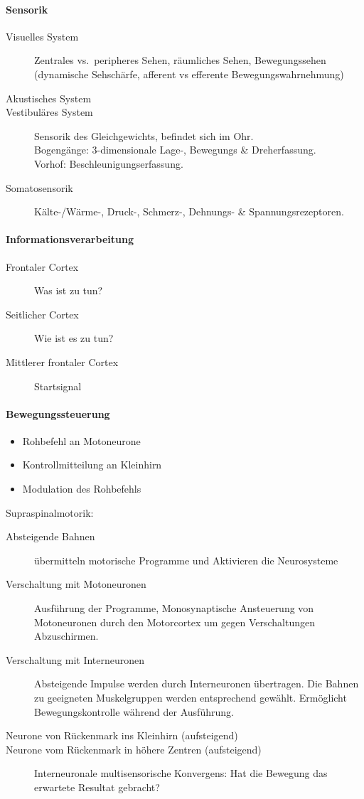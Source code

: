 \paragraph{Sensorik}
\begin{description}
  \item[Visuelles System] Zentrales vs.\ peripheres Sehen, räumliches Sehen, Bewegungssehen (dynamische Sehschärfe, afferent vs efferente Bewegungswahrnehmung)
  \item[Akustisches System]
  \item[Vestibuläres System] Sensorik des Gleichgewichts, befindet sich im Ohr.\\
    Bogengänge: 3-dimensionale Lage-, Bewegungs \& Dreherfassung.\\
    Vorhof: Beschleunigungserfassung.\\
  \item[Somatosensorik] Kälte-/Wärme-, Druck-, Schmerz-, Dehnungs- \& Spannungsrezeptoren.\\
\end{description}
\paragraph{Informationsverarbeitung}
\begin{description}
  \item[Frontaler Cortex] Was ist zu tun?
  \item[Seitlicher Cortex] Wie ist es zu tun?
  \item[Mittlerer frontaler Cortex] Startsignal
\end{description}
\paragraph{Bewegungssteuerung}
\begin{itemize}
  \item Rohbefehl an Motoneurone
  \item Kontrollmitteilung an Kleinhirn
  \item Modulation des Rohbefehls
\end{itemize}
Supraspinalmotorik:
\begin{description}
  \item[Absteigende Bahnen] übermitteln motorische Programme und Aktivieren die Neurosysteme
  \item[Verschaltung mit Motoneuronen] Ausführung der Programme, Monosynaptische Ansteuerung von Motoneuronen durch den Motorcortex um gegen Verschaltungen Abzuschirmen.
  \item[Verschaltung mit Interneuronen] Absteigende Impulse werden durch Interneuronen übertragen.
    Die Bahnen zu geeigneten Muskelgruppen werden entsprechend gewählt.
    Ermöglicht Bewegungskontrolle während der Ausführung.
  \item[Neurone von Rückenmark ins Kleinhirn (aufsteigend)] 
  \item[Neurone vom Rückenmark in höhere Zentren (aufsteigend)] Interneuronale multisensorische Konvergens: Hat die Bewegung das erwartete Resultat gebracht?
\end{description}

